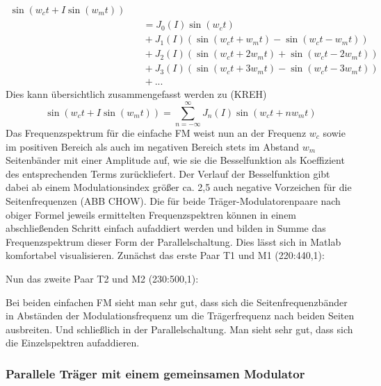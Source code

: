 \begin{equation}
\begin{split}
\sin(w_ct + I\sin(w_mt)) \\ &\quad = J_0(I)\sin(w_ct) \\ &\quad + J_1(I)\left(\sin(w_ct + w_mt) - \sin(w_ct - w_mt)\right) \\ &\quad + J_2(I)\left(\sin(w_ct + 2w_mt)+\sin(w_ct-2w_mt)\right) \\ &\quad  + J_3(I)\left(\sin(w_ct + 3w_mt) - \sin(w_ct - 3w_mt)\right) \\ &\quad  + ...
\end{split}
\end{equation}
Dies kann übersichtlich zusammengefasst werden zu (KREH)
\begin{equation}
\sin(w_ct + I\sin(w_mt)) = \sum_{n=-\infty}^{\infty}J_n(I)\sin(w_ct+nw_mt)
\end{equation}
Das Frequenzspektrum für die einfache FM weist nun an der Frequenz \begin{math} w_c \end{math} sowie im positiven Bereich als auch im negativen Bereich stets im Abstand \begin{math} w_m \end{math} Seitenbänder mit einer Amplitude auf, wie sie die Besselfunktion als Koeffizient des entsprechenden Terms zurückliefert. Der Verlauf der Besselfunktion gibt dabei ab einem Modulationsindex größer ca. 2,5 auch negative Vorzeichen für die Seitenfrequenzen (ABB CHOW). Die für beide Träger-Modulatorenpaare nach obiger Formel jeweils ermittelten Frequenzspektren können in einem abschließenden Schritt einfach aufaddiert werden und bilden in Summe das Frequenzspektrum dieser Form der Parallelschaltung. Dies lässt sich in Matlab komfortabel visualisieren. Zunächst das erste Paar T1 und M1 (220:440,1):

Nun das zweite Paar T2 und M2 (230:500,1):

Bei beiden einfachen FM sieht man sehr gut, dass sich die Seitenfrequenzbänder in Abständen der Modulationsfrequenz um die Trägerfrequenz nach beiden Seiten ausbreiten. Und schließlich in der Parallelschaltung. Man sieht sehr gut, dass sich die Einzelspektren aufaddieren. 


\subsubsection{Parallele Träger mit einem gemeinsamen Modulator}

